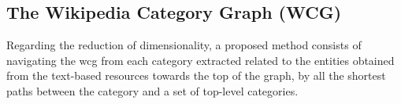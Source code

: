 





\subsection{\hspace*{3pt} The Wikipedia Category Graph (WCG)}

Regarding the reduction of dimensionality, a proposed method consists of navigating the \gls{wcg} from each category extracted related to the entities obtained from the text-based resources towards the top of the graph, by all the shortest paths between the category and a set of top-level categories. 


